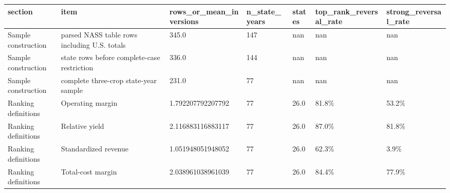 \begin{tabular}{lllllll}
\toprule
section & item & rows\_or\_mean\_inversions & n\_state\_years & states & top\_rank\_reversal\_rate & strong\_reversal\_rate \\
\midrule
Sample construction & parsed NASS table rows including U.S. totals & 345.0 & 147 & nan & nan & nan \\
Sample construction & state rows before complete-case restriction & 336.0 & 144 & nan & nan & nan \\
Sample construction & complete three-crop state-year sample & 231.0 & 77 & nan & nan & nan \\
Ranking definitions & Operating margin & 1.792207792207792 & 77 & 26.0 & 81.8\% & 53.2\% \\
Ranking definitions & Relative yield & 2.116883116883117 & 77 & 26.0 & 87.0\% & 81.8\% \\
Ranking definitions & Standardized revenue & 1.051948051948052 & 77 & 26.0 & 62.3\% & 3.9\% \\
Ranking definitions & Total-cost margin & 2.038961038961039 & 77 & 26.0 & 84.4\% & 77.9\% \\
\bottomrule
\end{tabular}
